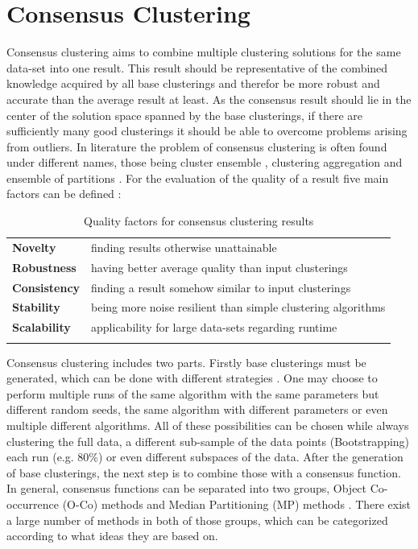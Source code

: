 \documentclass[
	a4paper,
	english,
	twoside,
	openright,               
	11pt                            
	]{report}
\begin{document}
\section{Consensus Clustering}\label{sec:consensus}
Consensus clustering aims to combine multiple clustering solutions for the same data-set into one result. This result should be representative of the combined knowledge acquired by all base clusterings and therefor be more robust and accurate than the average result at least. As the consensus result should lie in the center of the solution space spanned by the base clusterings, if there are sufficiently many good clusterings it should be able to overcome problems arising from outliers. In literature the problem of consensus clustering is often found under different names, those being cluster ensemble \cite{BOONGOEN20181}, clustering aggregation \cite{Gionis2005ClusteringA} and ensemble of partitions \cite{ensemblepartitions}. For the evaluation of the quality of a result five main factors can be defined \cite{Ghaemi2009ASC,survey1}:\newline

\begin{table}[ht]

\begin{tabular}{ll}
	\textbf{Novelty} & finding results otherwise unattainable \\
	\textbf{Robustness} & having better average quality than input clusterings \\
	\textbf{Consistency}   & finding a result somehow similar to input clusterings \\
	\textbf{Stability} & being more noise resilient than simple clustering algorithms \\
	\textbf{Scalability} & applicability for large data-sets regarding runtime \\
	&
\end{tabular}
\caption{Quality factors for consensus clustering results}
\end{table}

Consensus clustering includes two parts. Firstly base clusterings must be generated, which can be done with different strategies \cite{BOONGOEN20181}. One may choose to perform multiple runs of the same algorithm with the same parameters but different random seeds, the same algorithm with different parameters or even multiple different algorithms. All of these possibilities can be chosen while always clustering the full data, a different sub-sample of the data points (Bootstrapping) \cite{bootstrapping} each run (e.g. 80\%) or even different subspaces of the data. After the generation of base clusterings, the next step is to combine those with a consensus function. In general, consensus functions can be separated into two groups, Object Co-occurrence (O-Co) methods and Median Partitioning (MP) methods \cite{survey1}. There exist a large number of methods in both of those groups, which can be categorized according to what ideas they are based on.
\end{document}
